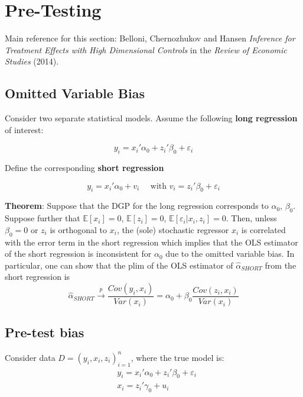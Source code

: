 \documentclass[12pt,]{book}
\begin{document}
\hypertarget{pre-testing}{%
\section{Pre-Testing}\label{pre-testing}}

Main reference for this section: Belloni, Chernozhukov and Hansen \emph{Inference for Treatment Effects with High Dimensional Controls} in the \emph{Review of Economic Studies} (2014).

\hypertarget{omitted-variable-bias}{%
\subsection{Omitted Variable Bias}\label{omitted-variable-bias}}

Consider two separate statistical models. Assume the following \textbf{long regression} of interest:

\[
  y_i = x_i' \alpha_0+ z_i' \beta_0 + \varepsilon_i
\]

Define the corresponding \textbf{short regression}

\[
  y_i = x_i' \alpha_0 + v_i \quad \text{ with } v_i = z_i' \beta_0 + \varepsilon_i
\]

\textbf{Theorem}:
Suppose that the DGP for the long regression corresponds to \(\alpha_0\), \(\beta_0\). Suppose further that \(\mathbb E[x_i] = 0\), \(\mathbb E[z_i] = 0\), \(\mathbb E[\varepsilon_i |x_i,z_i] = 0\). Then, unless \(\beta_0 = 0\) or \(z_i\) is orthogonal to \(x_i\), the (sole) stochastic regressor \(x_i\) is correlated with the error term in the short regression which implies that the OLS estimator of the short regression is inconsistent for \(\alpha_0\) due to the omitted variable bias. In particular, one can show that the plim of the OLS estimator of \(\hat{\alpha}_{SHORT}\) from the short regression is
\[
    \hat{\alpha}_{SHORT} \overset{p}{\to} \frac{Cov(y_i, x_i)}{Var(x_i)} = \alpha_0 + \beta_0 \frac{Cov(z_i, x_i)}{Var(x_i)}
\]

\hypertarget{pre-test-bias}{%
\subsection{Pre-test bias}\label{pre-test-bias}}

Consider data \(D= (y_i, x_i, z_i)_{i=1}^n\), where the true model is:
\[
\begin{aligned}
& y_i = x_i' \alpha_0  + z_i' \beta_0 + \varepsilon_i \\
& x_i = z_i' \gamma_0 + u_i
\end{aligned}
\]
\end{document}
